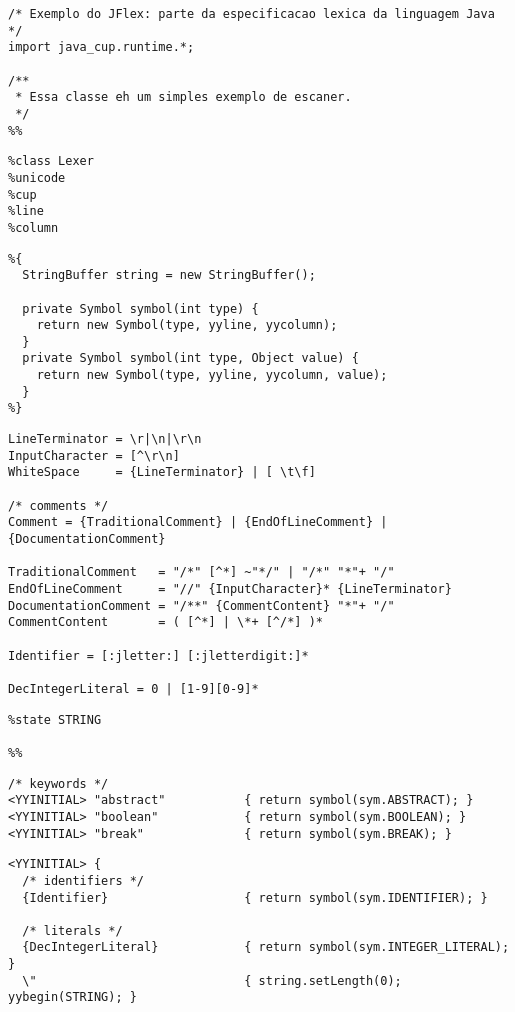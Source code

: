 \documentclass[11pt]{scrartcl}
\newcommand{\xtiny}{\small}
\begin{document}
{\xtiny
\label{CodeTop}\begin{verbatim}
/* Exemplo do JFlex: parte da especificacao lexica da linguagem Java */
import java_cup.runtime.*;

/**
 * Essa classe eh um simples exemplo de escaner.
 */
%%
\end{verbatim}
\label{CodeOptions}\begin{verbatim}
%class Lexer
%unicode
%cup
%line
%column
\end{verbatim}
\label{CodeScannerCode}\begin{verbatim}
%{
  StringBuffer string = new StringBuffer();

  private Symbol symbol(int type) {
    return new Symbol(type, yyline, yycolumn);
  }
  private Symbol symbol(int type, Object value) {
    return new Symbol(type, yyline, yycolumn, value);
  }
%}
\end{verbatim}
\label{CodeMacros}\begin{verbatim}
LineTerminator = \r|\n|\r\n
InputCharacter = [^\r\n]
WhiteSpace     = {LineTerminator} | [ \t\f]

/* comments */
Comment = {TraditionalComment} | {EndOfLineComment} | {DocumentationComment}

TraditionalComment   = "/*" [^*] ~"*/" | "/*" "*"+ "/"
EndOfLineComment     = "//" {InputCharacter}* {LineTerminator}
DocumentationComment = "/**" {CommentContent} "*"+ "/"
CommentContent       = ( [^*] | \*+ [^/*] )*

Identifier = [:jletter:] [:jletterdigit:]*

DecIntegerLiteral = 0 | [1-9][0-9]*
\end{verbatim}
\label{CodeStateDecl}\begin{verbatim}
%state STRING

%%
\end{verbatim}
\label{CodeRulesYYINITIAL}\begin{verbatim}
/* keywords */
<YYINITIAL> "abstract"           { return symbol(sym.ABSTRACT); }
<YYINITIAL> "boolean"            { return symbol(sym.BOOLEAN); }
<YYINITIAL> "break"              { return symbol(sym.BREAK); }
\end{verbatim}
\label{CodeRulesBunch}\begin{verbatim}
<YYINITIAL> {
  /* identifiers */ 
  {Identifier}                   { return symbol(sym.IDENTIFIER); }
 
  /* literals */
  {DecIntegerLiteral}            { return symbol(sym.INTEGER_LITERAL); }
  \"                             { string.setLength(0); yybegin(STRING); }


\end{verbatim}}
\end{document}
